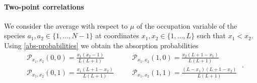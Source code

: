 \documentclass[10pt]{article}
\numberwithin{equation}{section}
\numberwithin{equation}{subsection}
\newcommand{\dt}{\;.}
\begin{document}
\paragraph{Two-point correlations}
We consider the average with respect to $\mu$ of the occupation variable of the species  $a_{1},a_{2}\in \{1,\ldots,N-1\}$ at coordinates $x_{1},x_{2}\in \{1,\ldots,L\}$ such that $x_{1}< x_{2}$. 
Using \eqref{abs-probabilities} we obtain the absorption probabilities
\begin{equation}
	\begin{split}
	&\mathcal{P}_{x_{1},x_{2}}(0,0)=\frac{x_{1}(x_{2}-1)}{L(L+1)}\\
	&\mathcal{P}_{x_{1},x_{2}}(0,1)=\frac{x_{1}(L+1-x_{2})}{L(L+1)}
\end{split}\quad \begin{split}
	&\mathcal{P}_{x_{1},x_{2}}(1,0)=\frac{x_{2}(L+1-x_{1})}{L(L+1)}\\
	&\mathcal{P}_{x_{1},x_{2}}(1,1)=\frac{(L-x_{1})(L+1-x_{2})}{L(L+1)}
	\end{split}\dt
\end{equation}
\end{document}

